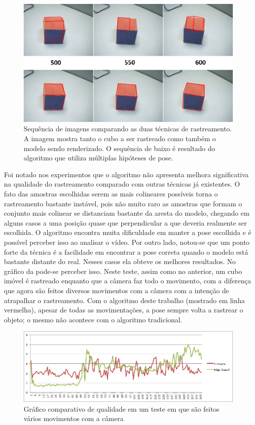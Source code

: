 \begin{figure}[!t]
\centering\includegraphics[width=\textwidth]{monografia/sequencia_cubo_real}
\caption{Sequência de imagens comparando as duas técnicas de rastreamento. A imagem mostra tanto o cubo a ser rastreado como também o modelo sendo renderizado. O sequência de baixo é resultado do algoritmo que utiliza múltiplas hipóteses de pose.}
\label{sequencia_cubo_real}
\end{figure}

Foi notado nos experimentos que o algoritmo não apresenta melhora significativa na qualidade do rastreamento comparado com outras técnicas já existentes. O fato das amostras escolhidas serem as mais colineares possíveis torna o rastreamento bastante instável, pois não muito raro as amostras que formam o conjunto mais colinear se distanciam bastante da aresta do modelo, chegando em alguns casos a uma posição quase que perpendicular a que deveria realmente ser escolhida. O algoritmo encontra muita dificuldade em manter a pose escolhida e é possível perceber isso ao analisar o vídeo. Por outro lado, notou-se que um ponto forte da técnica é a facilidade em encontrar a pose correta quando o modelo está bastante distante do real. Nesses casos ela obteve os melhores resultados. No gráfico da  pode-se perceber isso. Neste teste, assim como no anterior, um cubo imóvel é rastreado enquanto que a câmera faz todo o movimento, com a diferença que agora são feitos diversos movimentos com a câmera com a intenção de atrapalhar o rastreamento. Com o algoritmo deste trabalho (mostrado em linha vermelha), apesar de todas as movimentações, a pose sempre volta a rastrear o objeto; o mesmo não acontece com o algoritmo tradicional.

\begin{figure}[!ht]
\centering\includegraphics[width=\textwidth]{monografia/qualidade_celine_boa}
\caption{Gráfico comparativo de qualidade em um teste em que são feitos vários movimentos com a câmera}
\label{qualidade_celine_boa}
\end{figure}

